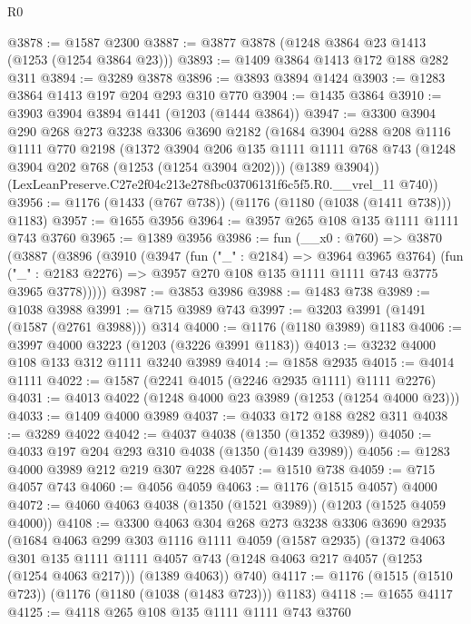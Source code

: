 \begin{lexlean}{R0}
\begin{coremodule}
@3878 := @1587 @2300
@3887 := @3877 @3878 (@1248 @3864 @23 @1413 (@1253 (@1254 @3864 @23)))
@3893 := @1409 @3864 @1413 @172 @188 @282 @311
@3894 := @3289 @3878
@3896 := @3893 @3894 @1424
@3903 := @1283 @3864 @1413 @197 @204 @293 @310 @770
@3904 := @1435 @3864
@3910 := @3903 @3904 @3894 @1441 (@1203 (@1444 @3864))
@3947 := @3300
    @3904
    @290
    @268
    @273
    @3238
    @3306
    @3690
    @2182
    (@1684
      @3904
      @288
      @208
      @1116
      @1111
      @770
      @2198
      (@1372
        @3904
        @206
        @135
        @1111
        @1111
        @768
        @743
        (@1248 @3904 @202 @768 (@1253 (@1254 @3904 @202)))
        (@1389 @3904))
      (LexLeanPreserve.C27e2f04c213e278fbc03706131f6c5f5.R0.__vrel_11 @740))
@3956 := @1176 (@1433 (@767 @738)) (@1176 (@1180 (@1038 (@1411 @738))) @1183)
@3957 := @1655 @3956
@3964 := @3957 @265 @108 @135 @1111 @1111 @743 @3760
@3965 := @1389 @3956
@3986 := fun (__x0 : @760) =>
  @3870
    (@3887
      (@3896
        (@3910
          (@3947
            (fun ("_" : @2184) => @3964 @3965 @3764)
            (fun ("_" : @2183 @2276) => @3957 @270 @108 @135 @1111 @1111 @743 @3775 @3965 @3778)))))
@3987 := @3853 @3986
@3988 := @1483 @738
@3989 := @1038 @3988
@3991 := @715 @3989 @743
@3997 := @3203 @3991 (@1491 (@1587 (@2761 @3988))) @314
@4000 := @1176 (@1180 @3989) @1183
@4006 := @3997 @4000 @3223 (@1203 (@3226 @3991 @1183))
@4013 := @3232 @4000 @108 @133 @312 @1111 @3240 @3989
@4014 := @1858 @2935
@4015 := @4014 @1111
@4022 := @1587 (@2241 @4015 (@2246 @2935 @1111) @1111 @2276)
@4031 := @4013 @4022 (@1248 @4000 @23 @3989 (@1253 (@1254 @4000 @23)))
@4033 := @1409 @4000 @3989
@4037 := @4033 @172 @188 @282 @311
@4038 := @3289 @4022
@4042 := @4037 @4038 (@1350 (@1352 @3989))
@4050 := @4033 @197 @204 @293 @310 @4038 (@1350 (@1439 @3989))
@4056 := @1283 @4000 @3989 @212 @219 @307 @228
@4057 := @1510 @738
@4059 := @715 @4057 @743
@4060 := @4056 @4059
@4063 := @1176 (@1515 @4057) @4000
@4072 := @4060 @4063 @4038 (@1350 (@1521 @3989)) (@1203 (@1525 @4059 @4000))
@4108 := @3300
    @4063
    @304
    @268
    @273
    @3238
    @3306
    @3690
    @2935
    (@1684
      @4063
      @299
      @303
      @1116
      @1111
      @4059
      (@1587 @2935)
      (@1372
        @4063
        @301
        @135
        @1111
        @1111
        @4057
        @743
        (@1248 @4063 @217 @4057 (@1253 (@1254 @4063 @217)))
        (@1389 @4063))
      @740)
@4117 := @1176 (@1515 (@1510 @723)) (@1176 (@1180 (@1038 (@1483 @723))) @1183)
@4118 := @1655 @4117
@4125 := @4118 @265 @108 @135 @1111 @1111 @743 @3760

\end{coremodule}
\end{lexlean}
